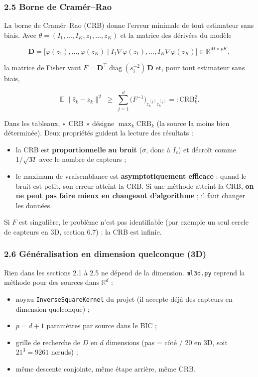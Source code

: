 \documentclass[
  french,
]{article}
\providecommand{\tightlist}{%
  \setlength{\itemsep}{0pt}\setlength{\parskip}{0pt}}
\begin{document}
\subsubsection{2.5 Borne de Cramér--Rao}\label{borne-de-cramuxe9rrao}

La borne de Cramér--Rao (CRB) donne l'erreur minimale de tout estimateur
sans biais. Avec \(\theta = (I_1,\dots,I_K, z_1,\dots,z_K)\) et la
matrice des dérivées du modèle

\[
\mathbf{D} = \Big[\varphi(z_1),\dots,\varphi(z_K)\;\Big\vert\;I_1\nabla\varphi(z_1),\dots,I_K\nabla\varphi(z_K)\Big]\in\mathbb{R}^{M\times pK},
\]

la matrice de Fisher vaut
\(F = \mathbf{D}^{\top}\operatorname{diag}(s_i^{-2})\,\mathbf{D}\) et,
pour tout estimateur sans biais,

\[
\mathbb{E}\,\lVert\hat z_k - z_k\rVert^2 \;\ge\; \sum_{j=1}^{d}\big(F^{-1}\big)_{z_k^{(j)} z_k^{(j)}} =: \mathrm{CRB}_k^2 .
\]

Dans les tableaux, « CRB » désigne \(\max_k\mathrm{CRB}_k\) (la source
la moins bien déterminée). Deux propriétés guident la lecture des
résultats :

\begin{itemize}
\tightlist
\item
  la CRB est \textbf{proportionnelle au bruit} (\(\sigma\), donc à
  \(I_c\)) et décroît comme \(1/\sqrt M\) avec le nombre de capteurs ;
\item
  le maximum de vraisemblance est \textbf{asymptotiquement efficace} :
  quand le bruit est petit, son erreur atteint la CRB. Si une méthode
  atteint la CRB, \textbf{on ne peut pas faire mieux en changeant
  d'algorithme} ; il faut changer les données.
\end{itemize}

Si \(F\) est singulière, le problème n'est pas identifiable (par exemple
un seul cercle de capteurs en 3D, section 6.7) : la CRB est infinie.

\subsubsection{2.6 Généralisation en dimension quelconque
(3D)}\label{guxe9nuxe9ralisation-en-dimension-quelconque-3d}

Rien dans les sections 2.1 à 2.5 ne dépend de la dimension.
\texttt{ml3d.py} reprend la méthode pour des sources dans
\(\mathbb{R}^d\) :

\begin{itemize}
\tightlist
\item
  noyau \texttt{InverseSquareKernel} du projet (il accepte déjà des
  capteurs en dimension quelconque) ;
\item
  \(p = d + 1\) paramètres par source dans le BIC ;
\item
  grille de recherche de \(D\) en \(d\) dimensions (pas = côté / 20 en
  3D, soit \(21^3 = 9261\) nœuds) ;
\item
  même descente conjointe, même étape arrière, même CRB.
\end{itemize}
\end{document}
